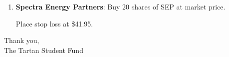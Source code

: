 \documentclass[11pt,pressrelease]{newlfm} %
\begin{document}
\begin{newlfm}




\begin{enumerate}
\item  \textbf{Spectra Energy Partners}: Buy 20 shares of SEP at market price.

Place stop loss at \$41.95.




\end{enumerate}


Thank you, \\
The Tartan Student Fund



\end{newlfm}
\end{document}
